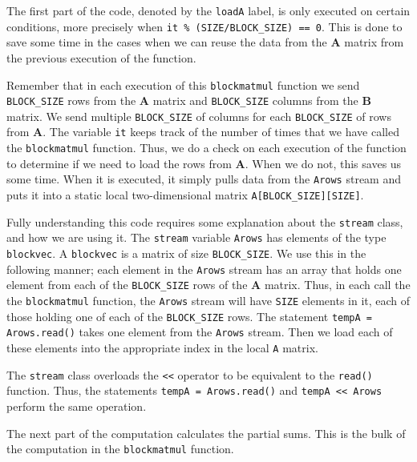 The first part of the code, denoted by the \lstinline{loadA} label, is only executed on certain conditions, more precisely when \lstinline{it % (SIZE/BLOCK_SIZE) == 0}. This is done to save some time in the cases when we can reuse the data from the $\mathbf{A}$ matrix from the previous execution of the function. 

Remember that in each execution of this \lstinline{blockmatmul} function we send \lstinline{BLOCK_SIZE} rows from the $\mathbf{A}$ matrix and \lstinline{BLOCK_SIZE} columns from the $\mathbf{B}$ matrix. We send multiple \lstinline{BLOCK_SIZE} of columns for each \lstinline{BLOCK_SIZE} of rows from $\mathbf{A}$. The variable \lstinline{it} keeps track of the number of times that we have called the \lstinline{blockmatmul} function. Thus, we do a check on each execution of the function to determine if we need to load the rows from $\mathbf{A}$. When we do not, this saves us some time. When it is executed, it simply pulls data from the \lstinline{Arows} stream and puts it into a static local two-dimensional matrix \lstinline{A[BLOCK_SIZE][SIZE]}. 

Fully understanding this code requires some explanation about the \lstinline{stream} class, and how we are using it. The \lstinline{stream} variable \lstinline{Arows} has elements of the type \lstinline{blockvec}. A \lstinline{blockvec} is a matrix of size \lstinline{BLOCK_SIZE}. We use this in the following manner; each element in the \lstinline{Arows} stream has an array that holds one element from each of the \lstinline{BLOCK_SIZE} rows of the $\mathbf{A}$ matrix. Thus, in each call the the \lstinline{blockmatmul} function, the \lstinline{Arows} stream will have \lstinline{SIZE} elements in it, each of those holding one of each of the \lstinline{BLOCK_SIZE} rows. The statement \lstinline{tempA = Arows.read()} takes one element from the \lstinline{Arows} stream. Then we load each of these elements into the appropriate index in the local \lstinline{A} matrix.

\begin{aside}
The \lstinline{stream} class overloads the \lstinline{<<} operator to be equivalent to the \lstinline{read()} function. Thus, the statements \lstinline{tempA = Arows.read()} and \lstinline{tempA << Arows} perform the same operation.
\end{aside}

The next part of the computation calculates the partial sums. This is the bulk of the computation in the \lstinline{blockmatmul} function. 

